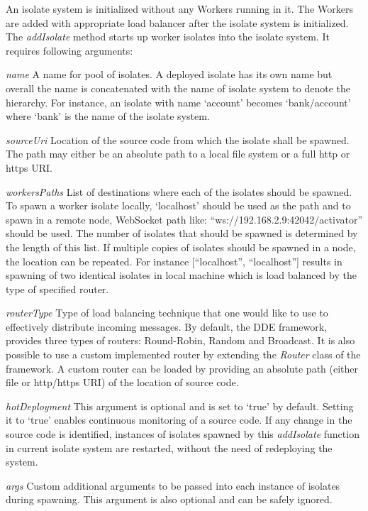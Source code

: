   An isolate system is initialized without any Workers running in it. The Workers are added with appropriate load balancer after the isolate system is initialized. The \emph{addIsolate} method starts up worker isolates into the isolate system. It requires following arguments:
  \begin{description}
    \item{\itshape{name}} \textendash{} A name for pool of isolates. A deployed isolate has its own name but overall the name is concatenated with the name of isolate system to denote the hierarchy. For instance, an isolate with name ‘account’ becomes ‘bank/account’ where ‘bank’ is the name of the isolate system.
    \item{\itshape{sourceUri}} \textendash{} Location of the source code from which the isolate shall be spawned. The path may either be an absolute path to a local file system or a full http or https URI.
    \item{\itshape{workersPaths}} \textendash{} List of destinations where each of the isolates should be spawned. To spawn a worker isolate locally, ‘localhost’ should be used as the path and to spawn in a remote node, WebSocket path like: “ws://192.168.2.9:42042/activator” should be used. The number of isolates that should be spawned is determined by the length of this list. If multiple copies of isolates should be spawned in a node, the location can be repeated. For instance [“localhost”, “localhost”] results in spawning of two identical isolates in local machine which is load balanced by the type of specified router.
    \item{\itshape{routerType}} \textendash{} Type of load balancing technique that one would like to use to effectively distribute incoming messages. By default, the DDE framework, provides three types of routers: Round-Robin, Random and Broadcast. It is also possible to use a custom implemented router by extending the \emph{Router} class of the framework. A custom router can be loaded by providing an absolute path (either file or http/https URI) of the location of source code.
    \item{\itshape{hotDeployment}} \textendash{} This argument is optional and is set to ‘true’ by default. Setting it to ‘true’ enables continuous monitoring of a source code. If any change in the source code is identified, instances of isolates spawned by this \emph{addIsolate} function in current isolate system are restarted, without the need of redeploying the system.
    \item{\itshape{args}} \textendash{} Custom additional arguments to be passed into each instance of isolates during spawning. This argument is also optional and can be safely ignored.
  \end{description}

